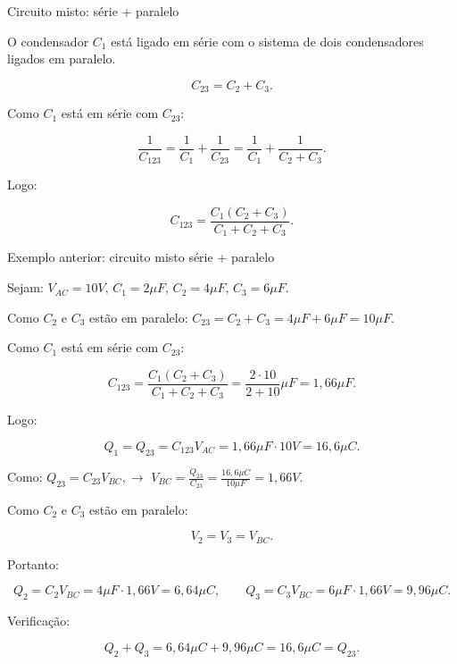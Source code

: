 \documentclass{beamer}
\begin{document}
\begin{frame}{Circuito misto: série + paralelo}
\begin{center}
		\end{center}
		
		O condensador \(C_1\) está ligado em série com o sistema de dois condensadores ligados em paralelo.
		
		\[
		C_{23}=C_2+C_3.
		\]
		
		Como \(C_1\) está em série com \(C_{23}\):
		
		\[
		\frac{1}{C_{123}}
		=
		\frac{1}{C_1}
		+
		\frac{1}{C_{23}}
		=
		\frac{1}{C_1}
		+
		\frac{1}{C_2+C_3}.
		\]
		
		Logo:
		
		\[
		C_{123}
		=
		\frac{C_1(C_2+C_3)}{C_1+C_2+C_3}.
		\]
	\end{frame}
	
	\begin{frame}{Exemplo anterior: circuito misto série + paralelo}
		\scriptsize
		
		Sejam:
		$
		V_{AC}=10V,
		\,
		C_1=2\mu F,
		\,
		C_2=4\mu F,
		\,
		C_3=6\mu F.
		$
		\vspace{0.2cm}
		
		Como \(C_2\) e \(C_3\) estão em paralelo:
		$
		C_{23}=C_2+C_3=4\mu F+6\mu F=10\mu F.
		$
			
		\vspace{0.2cm}
				
		Como \(C_1\) está em série com \(C_{23}\):
		
		\[
		C_{123}
		=
		\frac{C_1(C_2+C_3)}{C_1+C_2+C_3}
		=
		\frac{2\cdot 10}{2+10}\mu F
		=
		1,66\mu F.
		\]
		
		Logo:
		
		\[
		Q_1=Q_{23}=C_{123}V_{AC}
		=
		1,66\mu F\cdot 10V
		=
		16,6\mu C.
		\]
		
		Como:
		$
		Q_{23}=C_{23}V_{BC},
		\rightarrow  \,\, V_{BC}
		=
		\frac{Q_{23}}{C_{23}}
		=
		\frac{16,6\mu C}{10\mu F}
		=
		1,66V.$
		
	
		
		Como \(C_2\) e \(C_3\) estão em paralelo:
		
		\[
		V_2=V_3=V_{BC}.
		\]
		
		Portanto:
		
		\[
		Q_2=C_2V_{BC}
		=
		4\mu F\cdot 1,66V
		=
		6,64\mu C,
		\qquad
		Q_3=C_3V_{BC}
		=
		6\mu F\cdot 1,66V
		=
		9,96\mu C.
		\]
		
		Verificação:
		
		\[
		Q_2+Q_3=6,64\mu C+9,96\mu C=16,6\mu C=Q_{23}.
		\]
	\end{frame}
	
\end{document}
